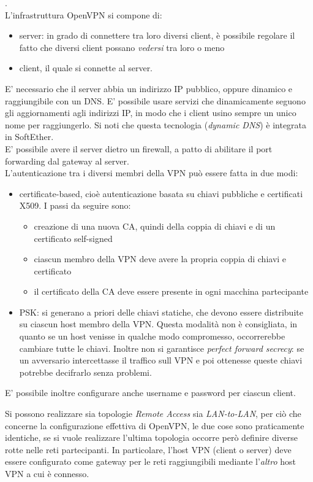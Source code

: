 \cite{openvpn-comparison}.\\
L'infrastruttura OpenVPN si compone di:
\begin{itemize}
  \item server: in grado di connettere tra loro diversi client, è possibile regolare
  il fatto che diversi client possano \textit{vedersi} tra loro o meno
  \item client, il quale si connette al server.
\end{itemize}
E' necessario che il server abbia un indirizzo IP pubblico, oppure dinamico e raggiungibile con un DNS. E' possibile
usare servizi che dinamicamente seguono gli aggiornamenti agli indirizzi IP, in modo che i client usino
sempre un unico nome per raggiungerlo. Si noti che questa tecnologia (\textit{dynamic DNS}) è integrata in SoftEther.\\
E' possibile avere il server dietro un firewall, a patto di abilitare il port forwarding dal gateway al server.\\
L'autenticazione tra i diversi membri della VPN può essere fatta in due modi:
\begin{itemize}
  \item certificate-based, cioè autenticazione basata su chiavi pubbliche e certificati
  X509. I passi da seguire sono:
  \begin{itemize}
    \item creazione di una nuova CA, quindi della coppia di chiavi e di un certificato
    self-signed
    \item ciascun membro della VPN deve avere la propria coppia di chiavi e certificato
    \item il certificato della CA deve essere presente in ogni macchina partecipante
  \end{itemize}
  \item PSK: si generano a priori delle chiavi statiche, che devono essere distribuite
  su ciascun host membro della VPN. Questa modalità non è consigliata, in quanto
  se un host venisse in qualche modo compromesso, occorrerebbe cambiare tutte le chiavi.
  Inoltre non si garantisce \textit{perfect forward secrecy}: se un avversario
  intercettasse il traffico sull VPN e poi ottenesse queste chiavi potrebbe
  decifrarlo senza problemi.
\end{itemize}
E' possibile inoltre configurare anche username e password per ciascun client.

Si possono realizzare sia topologie \textit{Remote Access} sia \textit{LAN-to-LAN},
per ciò che concerne la configurazione effettiva di OpenVPN, le due cose
sono praticamente identiche, se si vuole realizzare l'ultima topologia occorre
però definire diverse rotte nelle reti partecipanti. In particolare,
l'host VPN (client o server) deve essere configurato come gateway per le reti
raggiungibili mediante l'\textit{altro} host VPN a cui è connesso.

